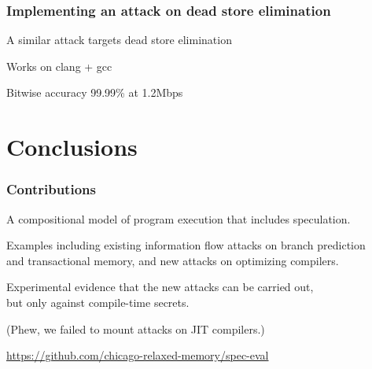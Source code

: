 \documentclass[aspectratio=169]{beamer}
\begin{document}
\begin{frame}
  \frametitle{Implementing an attack on dead store elimination}

  A similar attack targets dead store elimination

  \bigskip
  Works on clang + gcc

  \bigskip
  Bitwise accuracy 99.99\% at 1.2Mbps

\end{frame}

\section{Conclusions}
\begin{frame}
  \frametitle{Contributions}

  A compositional model of program execution that includes speculation.

  \bigskip
  Examples
  including existing information flow attacks on branch prediction\\
  and transactional memory, and new attacks on optimizing compilers.

  \bigskip
  Experimental evidence that the new attacks can be carried out,\\
  but only against compile-time secrets.

  \bigskip
  (Phew, we failed to mount attacks on JIT compilers.)

  \bigskip
  \bigskip
  \bigskip
  \bigskip
  \url{https://github.com/chicago-relaxed-memory/spec-eval}
\end{frame}


\end{document}
